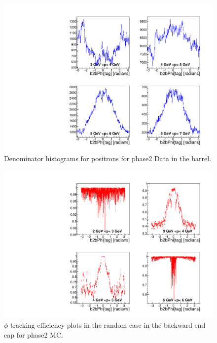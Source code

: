 \documentclass[a4paper,11pt,twosided,final,german,openbib,pdftex,listof=totoc,bibliography=totoc]{scrbook}
\begin{document}
\begin{appendix}
\begin{figure}[!htbp]
	\centering
	\includegraphics[width=\textwidth]{Plots/master/xPMPhiepBarrelD_Data}
	\caption[Momentum $\phi$ Positron Barrel Denominator Histogram Phase2 Data]{Denominator histograms for positrons for phase2 Data in the barrel.}
	\label{plt:PMPhiepBarrelD_Data}
\end{figure}

\begin{figure}[!htbp]
	\centering
	\includegraphics[width=\textwidth]{Plots/master/xPMPhiRandomEC_MC}
	\caption[Momentum $\phi$ Random Backward End Cap Efficiency Phase2 MC]{$\phi$ tracking efficiency plots in the random case in the backward end cap for phase2 MC.}
	\label{plt:PMPhiRandomEC_MC}
\end{figure}



\end{appendix}
\end{document}
